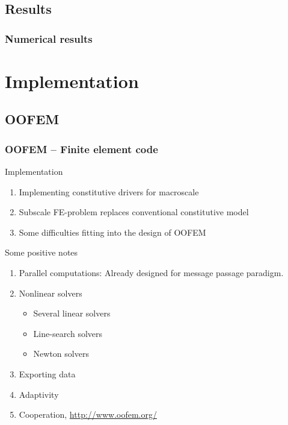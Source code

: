 \documentclass[11pt,mathserif]{beamer}
\begin{document}
\subsection{Results}
\begin{frame}
 \frametitle{Numerical results}
\begin{center}

\end{center}
\end{frame}

\section{Implementation}
\subsection{OOFEM}
\begin{frame}
 \frametitle{OOFEM -- Finite element code}
 Implementation
 \begin{enumerate}
  \item Implementing constitutive drivers for macroscale
  \item Subscale FE-problem replaces conventional constitutive model
  \item Some difficulties fitting into the design of OOFEM
 \end{enumerate}

 Some positive notes
 \begin{enumerate}
  \item<2-> Parallel computations: Already designed for message passage paradigm.
  \item<2-> Nonlinear solvers
  \begin{itemize}
   \item<2-> Several linear solvers
   \item<2-> Line-search solvers
   \item<2-> Newton solvers
  \end{itemize}
  \item<2-> Exporting data
  \item<2-> Adaptivity
  \item<2-> Cooperation, \url{http://www.oofem.org/}
 \end{enumerate}

\end{frame}
\end{document}

